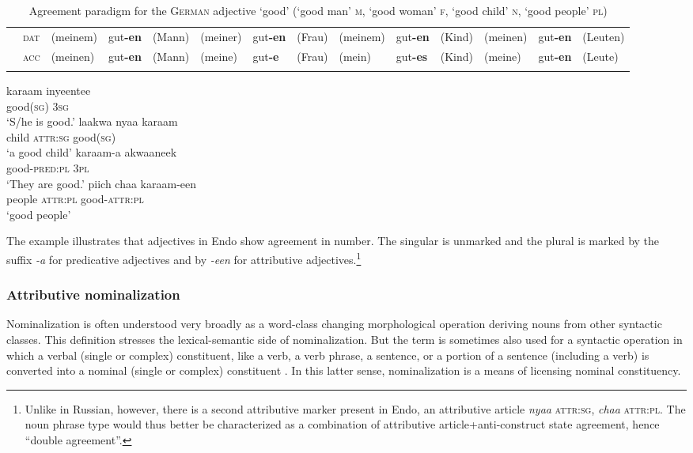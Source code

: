 \begin{landscape}
\begin{table}
\begin{footnotesize}
\begin{tabular}{|ll|lll|lll|lll|lll|}
&\textsc{dat}&(meinem)&gut\textbf{-en}&(Mann)&(meiner)&gut\textbf{-en}&(Frau)&(meinem)&gut\textbf{-en}&(Kind)&(meinen)&gut\textbf{-en}&(Leuten)\\		
&\textsc{acc}&(meinen)&gut\textbf{-en}&(Mann)&(meine)&gut\textbf{-e}&(Frau)&(mein)&gut\textbf{-es}&(Kind)&(meine)&gut\textbf{-en}&(Leute)\\	
\lspbottomrule
\end{tabular}
\end{footnotesize}
\caption[Adjective paradigm for \textsc{German}]{Agreement paradigm for the \textsc{German} adjective ‘good’ (‘good man’ \textsc{m}, ‘good woman’ \textsc{f}, ‘good child’ \textsc{n}, ‘good people’ \textsc{pl})} \label{german agr}
\end{table}
\end{landscape}
\begin{exe}
\ex
{}
\begin{xlist}
\ex
\gll 	karaam 	inyeentee\\
	good(\textsc{sg}) \textsc{3sg}\\	
\glt	‘S/he is good.’
\ex	
\gll 	laakwa 	nyaa 		karaam\\
	child 	\textsc{attr:sg} 	good(\textsc{sg})\\	
\glt	‘a good child’
\ex	
\gll 	karaam-a 	akwaaneek\\
	good-\textsc{pred:pl} 	\textsc{3pl}\\
\glt	‘They are good.’
\ex	
\gll 	piich 	chaa 		karaam-een\\
	people 	\textsc{attr:pl} 	good-\textsc{attr:pl}\\
\glt	‘good people’
\end{xlist}
\end{exe}
The example illustrates that adjectives in Endo show agreement in number. The singular is unmarked and the plural is marked by the suffix \textit{-a} for predicative adjectives and by \textit{-een} for attributive adjectives.\footnote{Unlike in Russian, however, there is a second attributive marker present in Endo, an attributive article \textit{nyaa} \textsc{attr:sg}, \textit{chaa} \textsc{attr:pl}. The noun phrase type would thus better be characterized as a combination of attributive article+anti-construct state agreement, hence “double agreement”.}

\subsubsection{Attributive nominalization} \label{attr nmlz}
Nominalization is often understood very broadly as a word-class changing morphological operation deriving nouns from other syntactic classes. This definition stresses the lexical-semantic side of nominalization. But the term is sometimes also used for a syntactic operation in which a verbal (single or complex) constituent, like a verb, a verb phrase, a sentence, or a portion of a sentence (including a verb) is converted into a nominal (single or complex) constituent \citep[575]{li-etal1981}. In this latter sense, nominalization is a means of licensing nominal constituency.

